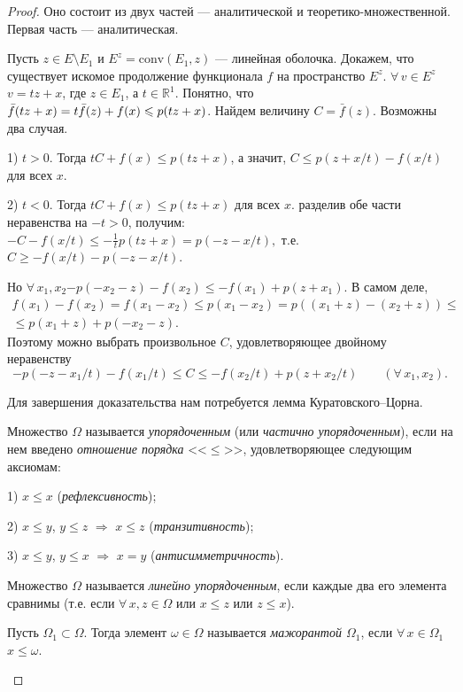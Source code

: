 \documentclass[12pt,titlepage, a4paper]{article}
\begin{document}
\begin{proof} Оно состоит из двух частей --- аналитической и
теоре\-ти\-ко-множественной. Первая часть --- аналитическая.

Пусть $z\in E\setminus E_1$ и $E^z=\mathrm{conv}(E_1,z)$
--- линейная оболочка. Докажем, что существует искомое продолжение
функционала $f$ на пространство $E^z$. $\forall\,v\in
E^z$\;\;$v=tz+x$, где $z\in E_1$, а $t\in\mathbb{R}^1$. Понятно, что
$\bar{f}(tz+x)\p=t\bar{f}(z)+f(x)\leqslant p(tz+x)$. Найдем величину
$C=\bar{f}(z)$. Возможны два случая.

1) $t>0$. Тогда $tC+f(x)\leqslant p(tz+x)$, а значит, $C\leqslant
p(z+x/t)-f(x/t)$ для всех $x$.

2) $t<0$. Тогда $tC+f(x)\leqslant p(tz+x)$ для всех $x$. разделив
обе части неравенства на $-t>0$, получим: $-C-f(x/t)\leqslant
-\frac{1}{t}p(tz+x)=p(-z-x/t),$ т.е. $C\geqslant -f(x/t)-p(-z-x/t)$.

Но $\forall\,x_1,x_2$\;\;$-p(-x_2-z)-f(x_2)\leqslant
-f(x_1)+p(z+x_1)$. В самом деле,
\begin{multline*}
f(x_1)-f(x_2)=f(x_1-x_2)\leqslant p(x_1-x_2)=p((x_1+z)-(x_2+z))\leqslant\\
\leqslant p(x_1+z)+p(-x_2-z).
\end{multline*}
Поэтому можно выбрать произвольное $C$, удовлетворяющее двойному
неравенству
$$-p(-z-x_1/t)-f(x_1/t)\leqslant C\leqslant -f(x_2/t)+p(z+x_2/t)\qquad
(\forall\,x_1,x_2).$$

Для завершения доказательства нам потребуется лемма
Куратовско\-го--Цорна.

\begin{defen}
Множество $\Omega$ называется \emph{упорядоченным} (или
\emph{частично упорядоченным}), если на нем введено \emph{отношение
порядка} <<$\leqslant$>>, удовлетворяющее следующим аксиомам:

1) $x\leqslant x$ (\emph{рефлексивность});

2) $x\leqslant y$, $y\leqslant z$ $\Rightarrow$ $x\leqslant z$
(\emph{транзитивность});

3) $x\leqslant y$, $y\leqslant x$ $\Rightarrow$ $x=y$
(\emph{антисимметричность}).

Множество $\Omega$ называется \emph{линейно упорядоченным}, если
каждые два его элемента сравнимы (т.е. если $\forall\,x,z\in\Omega$
или $x\leqslant z$ или $z\leqslant x$).

Пусть $\Omega_1\subset\Omega$. Тогда элемент $\omega\in\Omega$
называется \emph{мажорантой $\Omega_1$}, если
$\forall\,x\in\Omega_1$\;\;$x\leqslant\omega$.


\end{defen}
\end{proof}
\end{document}
